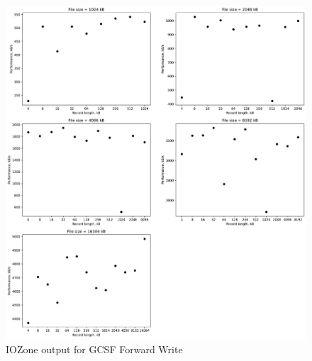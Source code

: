 \begin{figure}[!htb]
	\label{fig:app_begcsf_ffs_write}
	\begin{center}
		\includegraphics[width=1.0\textwidth]{figures/benchmarking/gcsf/Write.pdf}
	\end{center}
	\caption{IOZone output for \gls{GCSF} Forward Write}
\end{figure}

